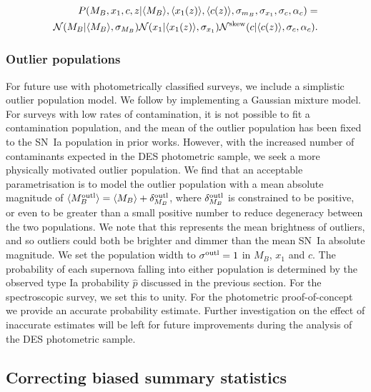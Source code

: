 \documentclass[a4paper,fleqn,usenatbib]{mnras}
\newcommand{\green}{\color{forestgreen}}
\newcommand{\rubin}{\citetalias{Rubin2015}}
\begin{document}
\begin{align}
P(M_B, x_1, c, z | \langle M_B \rangle, \langle x_1(z) \rangle, \langle c(z) \rangle, \sigma_{m_B}, \sigma_{x_1}, \sigma_c, \alpha_c) = \notag \\
\mathcal{N}(M_B|\langle M_B \rangle, \sigma_{M_B}) \mathcal{N}(x_1 | \langle x_1(z) \rangle, \sigma_{x_1}) \mathcal{N}^{\rm{skew}}(c| \langle c(z) \rangle, \sigma_c, \alpha_c) \label{eq:l1}.
\end{align}

\subsubsection{Outlier populations}

For future use with photometrically classified surveys, we include a simplistic outlier population model. We follow {\rubin} \citep[and therefore ][]{Kunz2007} by implementing a Gaussian mixture model. For surveys with low rates of contamination, it is not possible to fit a contamination population, and the mean of the outlier population has been fixed to the SN~Ia population in prior works. However, with the increased number of contaminants expected in the DES photometric sample, we seek a more physically motivated outlier population.  We find that an acceptable parametrisation is to model the outlier population with a mean absolute magnitude of $\langle M_B^{\rm outl} \rangle = \langle M_B \rangle + \delta_{M_B}^{\rm outl}$, where $\delta_{M_B}^{\rm outl}$ is constrained to be positive, or even to be greater than a small positive number to reduce degeneracy between the two populations. {\green We note that this represents the mean brightness of outliers, and so outliers could both be brighter and dimmer than the mean SN~Ia absolute magnitude.} We set the population width to $\sigma^{\rm outl} = 1$ in $M_B$, $x_1$ and $c$. The probability of each supernova falling into either population is determined by the observed type Ia probability $\hat{p}$ discussed in the previous section. For the spectroscopic survey, we set this to unity. For the photometric proof-of-concept we provide an accurate probability estimate. Further investigation on the effect of inaccurate {\green estimates will be left for} future improvements during the analysis of the DES photometric sample.


\subsection{Correcting biased summary statistics}
\end{document}
